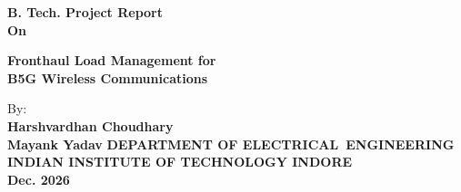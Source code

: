 \documentclass[12pt,a4paper]{article}
\newcommand{\studentA}{Harshvardhan Choudhary}
\newcommand{\studentB}{Mayank Yadav}
\newcommand{\discipline}{ELECTRICAL}
\newcommand{\btpdate}{Dec. 2026}
\begin{document}
\pagecolor{coverblue}
\color{gold}
\begin{center}
\vspace*{0.6cm}
{\fontsize{28}{34}\selectfont\bfseries B. Tech. Project Report}\\[0.8cm]
{\fontsize{20}{24}\selectfont\bfseries On}\\[0.8cm]
{\fontsize{34}{44}\selectfont\bfseries Fronthaul Load Management for\\[4pt] B5G Wireless Communications\par}
\vspace{1.2cm}
{\fontsize{18}{22}\selectfont By:}\\[0.4cm]
{\fontsize{16}{20}\selectfont\bfseries \studentA\\[0.15cm] \studentB}
\vfill
{\fontsize{16}{20}\selectfont\bfseries DEPARTMENT OF \discipline\ ENGINEERING}\\[0.25cm]
{\fontsize{16}{20}\selectfont\bfseries INDIAN INSTITUTE OF TECHNOLOGY INDORE}\\[0.25cm]
{\fontsize{16}{20}\selectfont\bfseries \btpdate}
\vspace*{1cm}
\end{center}
\end{document}
